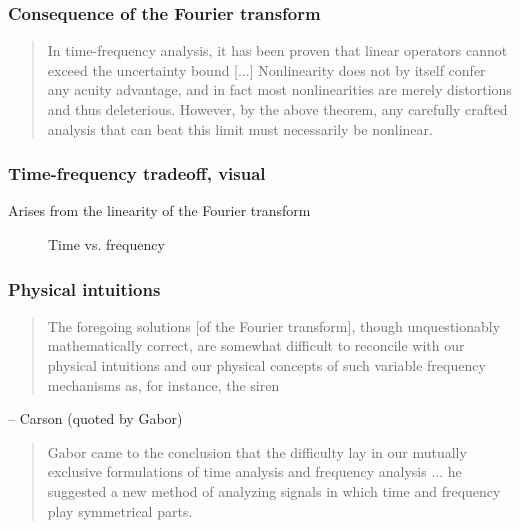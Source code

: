 \documentclass{beamer}
\begin{document}
\begin{frame}
	\frametitle{Consequence of the Fourier transform}
	\begin{quote}
	In time-frequency analysis, it has been proven that linear operators cannot exceed the uncertainty bound [...] Nonlinearity does not by itself confer any acuity advantage, and in fact most nonlinearities are merely distortions and thus deleterious. However, by the above theorem, any carefully crafted analysis that can beat this limit must necessarily be nonlinear.
	\end{quote}
\end{frame}

\begin{frame}
	\frametitle{Time-frequency tradeoff, visual}
	Arises from the linearity of the Fourier transform
	\begin{figure}
		\centering
		\hspace{0.2em}
		\caption{Time vs. frequency}
	\end{figure}
\end{frame}

\begin{frame}
	\frametitle{Physical intuitions}
	\begin{quote}
		The foregoing solutions [of the Fourier transform], though unquestionably mathematically correct, are somewhat difficult to reconcile with our physical intuitions and our physical concepts of such variable frequency mechanisms as, for instance, the siren
	\end{quote}
	-- Carson (quoted by Gabor)
	\begin{quote}
	\vspace{2em}
		Gabor came to the conclusion that the difficulty lay in our mutually exclusive formulations of time analysis and frequency analysis ... he suggested a new method of analyzing signals in which time and frequency play symmetrical parts.
	\end{quote}
\end{frame}
\end{document}

